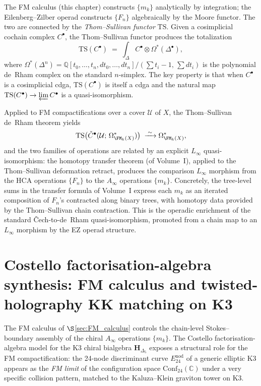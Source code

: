 \begin{remark}
\label{rem:analytic-algebraic-comparison}
The FM calculus (this chapter) constructs $\{m_k\}$ analytically
by integration; the Eilenberg--Zilber operad \cite{MS24}
constructs $\{F_n\}$ algebraically by the Moore functor. The
two are connected by the \emph{Thom--Sullivan functor}
$\mathrm{TS}$. Given a cosimplicial
cochain complex $C^\bullet$, the Thom--Sullivan functor produces
the totalization
\[
\mathrm{TS}(C^\bullet)
\;=\;
\int_{\Delta} C^\bullet \otimes \Omega^*(\Delta^\bullet),
\]
where $\Omega^*(\Delta^n) = \mathbb{Q}[t_0,\ldots,t_n,
dt_0,\ldots,dt_n]/(\sum t_i - 1,\, \sum dt_i)$ is the
polynomial de~Rham complex on the standard $n$-simplex.
The key property is that when $C^\bullet$ is a cosimplicial
cdga, $\mathrm{TS}(C^\bullet)$ is itself a cdga and the
natural map $\mathrm{TS}(C^\bullet) \to \varprojlim C^\bullet$
is a quasi-isomorphism.

Applied to FM compactifications over a cover
$\mathcal{U}$ of $X$, the Thom--Sullivan de~Rham theorem
yields
\[
\mathrm{TS}\bigl(\check{C}^\bullet(\mathcal{U};\, \Omega^*_{\FM_k(X)})\bigr)
\;\xrightarrow{\;\sim\;}
\Omega^*_{\FM_k(X)},
\]
and the two families of operations are related by an explicit
$L_\infty$ quasi-isomorphism: the homotopy transfer theorem
(of Volume~I), applied to
the Thom--Sullivan deformation retract, produces the comparison
$L_\infty$ morphism from the HCA operations $\{F_n\}$ to the
$A_\infty$ operations $\{m_k\}$. Concretely, the tree-level
sums in the transfer formula of Volume~I express each $m_k$ as an
iterated composition of $F_n$'s contracted along binary trees,
with homotopy data provided by the Thom--Sullivan chain
contraction. This is the operadic enrichment of the standard
\v{C}ech-to-de~Rham quasi-isomorphism, promoted from a chain
map to an $L_\infty$ morphism by the EZ operad structure.
\end{remark}

\section{Costello factorisation-algebra synthesis: FM calculus and twisted-holography KK matching on K3}
\label{sec:fm-costello-k3}

The FM calculus of $\S$\ref{sec:FM_calculus} controls the
chain-level Stokes--boundary assembly of the chiral $A_\infty$
operations $\{m_k\}$. The Costello factorisation-algebra model for
the K3 chiral bialgebra $\mathbf H_{\Delta_5}$ exposes a structural
role for the FM compactification: the
24-node discriminant curve $E^{\mathrm{nod}}_{24}$ of a generic
elliptic K3 appears as the \emph{FM limit} of the configuration
space $\mathrm{Conf}_{24}(\mathbb C)$ under a very specific
collision pattern, matched to the Kaluza--Klein graviton tower on
K3.

